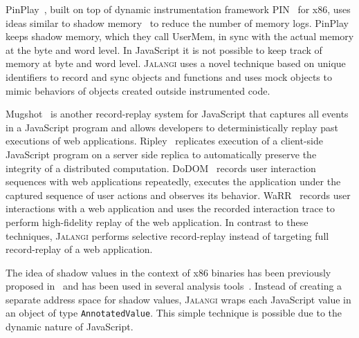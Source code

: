 \documentclass{sig-alternate}
\def\jalangi{\textsc{Jalangi}}
\begin{document}
PinPlay~\cite{Patil:2010:PFD:1772954.1772958}, built on top of dynamic
instrumentation framework PIN~\cite{Luk:2005:PBC:1065010.1065034} for
x86, uses ideas similar to shadow
memory~\cite{Narayanasamy:2006:ALO:1140277.1140303} to reduce the
number of memory logs.  PinPlay keeps shadow memory, which they call
UserMem, in sync with the actual memory at the byte and word level.
In JavaScript it is not possible to keep track of memory at byte and
word level.  \jalangi{} uses a novel technique based on unique
identifiers to record and sync objects and functions and uses mock
objects to mimic behaviors of objects created outside instrumented
code.  

Mugshot~\cite{Mickens:2010:MDC:1855711.1855722} is another
record-replay system for JavaScript that captures all events in a
JavaScript program and allows developers to deterministically replay
past executions of web applications.
Ripley~\cite{Vikram:2009:RAS:1653662.1653685} replicates execution of
a client-side JavaScript program on a server side replica to
automatically preserve the integrity of a distributed computation.
DoDOM~\cite{Pattabiraman:2010:DLD:1913797.1914375} records user
interaction sequences with web applications repeatedly, executes the
application under the captured sequence of user actions and observes
its behavior. %
WaRR~\cite{warr} records user interactions with a web application and
uses the recorded interaction trace to perform high-fidelity replay of
the web application.  In contrast to these techniques, \jalangi{}
performs selective record-replay instead of targeting full
record-replay of a web application.

The idea of shadow values in the context of x86 binaries has been
previously proposed
in~\cite{Nethercote:2007:VFH:1250734.1250746,Zhao:2010:1772954.1772960}
and has been used in several analysis
tools~\cite{Zhao:2010:1772954.1772960,songndss05,Bond:2007:TBA:1297027.1297057,hobbs}.
Instead of creating a separate address space for shadow values,
\jalangi{} wraps each JavaScript value in an object of type
\texttt{AnnotatedValue}.  This simple technique is possible due to the
dynamic nature of JavaScript.
\end{document}
